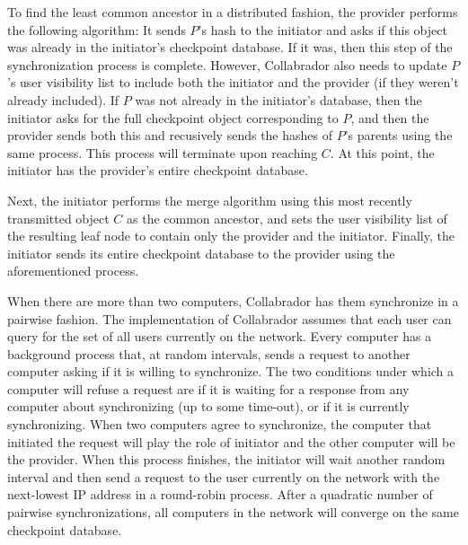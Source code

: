 \documentclass[11pt,titlepage]{article}
\begin{document}
To find the least common ancestor in a distributed fashion, the provider performs the following algorithm: It sends $P$'s hash to the initiator and asks if this object was already in the initiator's checkpoint database. If it was, then this step of the synchronization process is complete. However, Collabrador also needs to update $P$'s user visibility list to include both the initiator and the provider (if they weren't already included). If $P$ was not already in the initiator's database, then the initiator asks for the full checkpoint object corresponding to $P$, and then the provider sends both this and recusively sends the hashes of $P$'s parents using the same process. This process will terminate upon reaching $C$. At this point, the initiator has the provider's entire checkpoint database.

Next, the initiator performs the merge algorithm using this most recently transmitted object $C$ as the common ancestor, and sets the user visibility list of the resulting leaf node to contain only the provider and the initiator. Finally, the initiator sends its entire checkpoint database to the provider using the aforementioned process.

When there are more than two computers, Collabrador has them synchronize in a pairwise fashion. The implementation of Collabrador assumes that each user can query for the set of all users currently on the network. Every computer has a background process that, at random intervals, sends a request to another computer asking if it is willing to synchronize. The two conditions under which a computer will refuse a request are if it is waiting for a response from any computer about synchronizing (up to some time-out), or if it is currently synchronizing. When two computers agree to synchronize, the computer that initiated the request will play the role of initiator and the other computer will be the provider. When this process finishes, the initiator will wait another random interval and then send a request to the user currently on the network with the next-lowest IP address in a round-robin process. After a quadratic number of pairwise synchronizations, all computers in the network will converge on the same checkpoint database.
\end{document}
